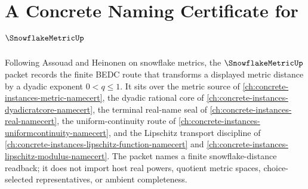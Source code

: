 \chapter{A Concrete Naming Certificate for $\SnowflakeMetricUp$}
\label{ch:concrete-instances-snowflake-metric-namecert}

Following Assouad and Heinonen on snowflake metrics, the $\SnowflakeMetricUp$ packet records the finite BEDC route that transforms a displayed metric distance by a dyadic exponent $0<q\leq 1$. It sits over the metric source of \autoref{ch:concrete-instances-metric-namecert}, the dyadic rational core of \autoref{ch:concrete-instances-dyadicratcore-namecert}, the terminal real-name seal of \autoref{ch:concrete-instances-real-namecert}, the uniform-continuity route of \autoref{ch:concrete-instances-uniformcontinuity-namecert}, and the Lipschitz transport discipline of \autoref{ch:concrete-instances-lipschitz-function-namecert} and \autoref{ch:concrete-instances-lipschitz-modulus-namecert}. The packet names a finite snowflake-distance readback; it does not import host real powers, quotient metric spaces, choice-selected representatives, or ambient completeness.

